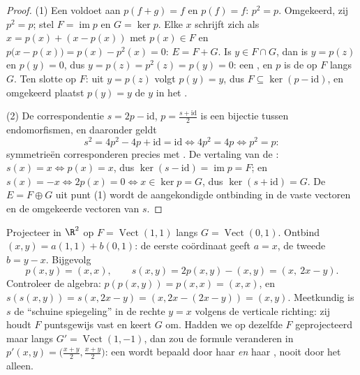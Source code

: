 \begin{proof}
(1) Een  voldoet aan $p(f + g) = f$ en $p(f) = f$: $p^2 =
p$. Omgekeerd, zij $p^2 = p$; stel $F = \operatorname{im} p$ en $G =
\ker p$. Elke $x$ schrijft zich als $x = p(x) + (x - p(x))$ met
$p(x) \in F$ en $p\bigl(x - p(x)\bigr) = p(x) - p^2(x) = 0$: $E = F
+ G$. Is $y \in F \cap G$, dan is $y = p(z)$ en $p(y) = 0$, dus $y =
p(z) = p^2(z) = p(y) = 0$: een , en $p$ is de 
op $F$ langs $G$. Ten slotte op $F$: uit $y = p(z)$ volgt $p(y) =
y$, dus $F \subseteq \ker(p - \mathrm{id})$, en omgekeerd plaatst
$p(y) = y$ de $y$ in het .

(2) De correspondentie $s = 2p - \mathrm{id}$, $p = \frac{s +
\mathrm{id}}2$ is een bijectie tussen endomorfismen, en daaronder
geldt
\[
s^2 = 4p^2 - 4p + \mathrm{id} = \mathrm{id}
\iff 4p^2 = 4p \iff p^2 = p :
\]
symmetrieën corresponderen precies met . De vertaling van
de : $s(x) = x \iff p(x) = x$, dus $\ker(s -
\mathrm{id}) = \operatorname{im} p = F$; en $s(x) = -x \iff 2p(x) =
0 \iff x \in \ker p = G$, dus $\ker(s + \mathrm{id}) = G$. De
 $E = F \oplus G$ uit punt (1) wordt de aangekondigde
ontbinding in de vaste vectoren en de omgekeerde vectoren van $s$.
\end{proof}

\begin{example}
\label{ex:b1:linmaps:projexplicit}
Projecteer in $\R^2$ op $F = \operatorname{Vect}(1,1)$ langs $G =
\operatorname{Vect}(0,1)$. Ontbind $(x, y) = a(1,1) + b(0,1)$: de
eerste coördinaat geeft $a = x$, de tweede $b = y - x$. Bijgevolg
\[
p(x, y) = (x, x),
\qquad
s(x, y) = 2p(x,y) - (x,y) = (x,\ 2x - y).
\]
Controleer de algebra: $p(p(x,y)) = p(x,x) = (x,x)$, en
$s(s(x,y)) = s(x, 2x - y) = (x, 2x - (2x - y)) = (x, y)$.
Meetkundig is $s$ de ``schuine spiegeling'' in de rechte $y = x$
volgens de verticale richting: zij houdt $F$ puntsgewijs vast en
keert $G$ om. Hadden we op dezelfde $F$ geprojecteerd maar langs
$G' = \operatorname{Vect}(1,-1)$, dan zou de formule veranderen in
$p'(x,y) = \bigl(\frac{x+y}2, \frac{x+y}2\bigr)$: een 
wordt bepaald door haar  \emph{en} haar , nooit door het
 alleen.
\end{example}

